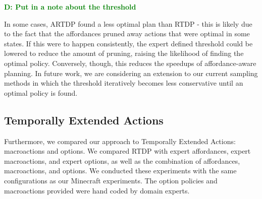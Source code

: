 \documentclass[conference]{IEEEtran}
\newcommand{\dnote}[1]{\textcolor{Green}{\textbf{D: #1}}}
\begin{document}
\dnote{Put in a note about the threshold}


In some cases, ARTDP found a less optimal plan than RTDP - this is likely due to 
the fact that the affordances pruned away actions that were optimal in some states. 
If this were to happen consistently, the expert defined threshold could be lowered to 
reduce the amount of pruning, raising the likelihood of finding the optimal policy. 
Conversely, though, this reduces the speedups of affordance-aware planning. In 
future work, we are considering an extension to our current sampling methods in 
which the threshold iteratively becomes less conservative until an optimal policy is found.

\subsection{Temporally Extended Actions}
Furthermore, we compared our approach to Temporally Extended Actions: 
macroactions and options. We compared RTDP with expert affordances, 
expert macroactions, and expert options, as well as the combination of 
affordances, macroactions, and options. We conducted these experiments 
with the same configurations as our Minecraft experiments. The option policies
and macroactions provided were hand coded by domain experts.
\end{document}
